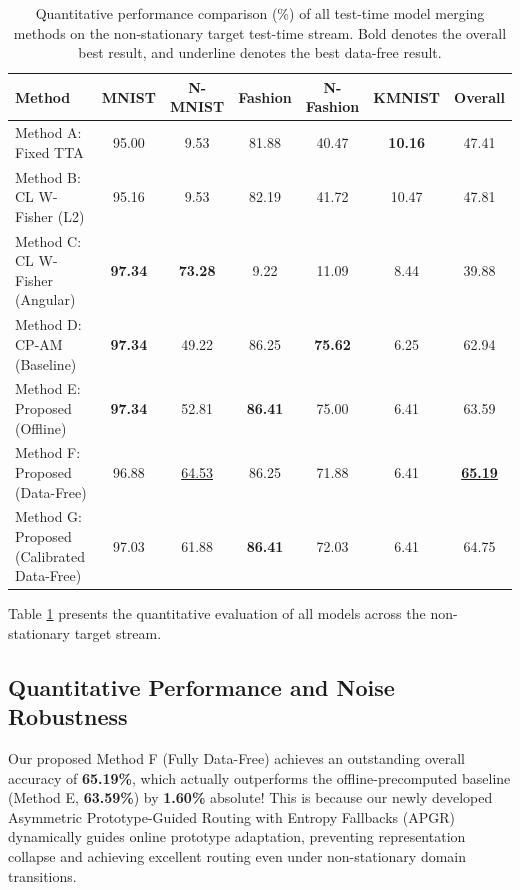 \documentclass{article}
\theoremstyle{plain}
\theoremstyle{definition}
\theoremstyle{remark}
\begin{document}
\begin{table}[t]
\caption{Quantitative performance comparison (\%) of all test-time model merging methods on the non-stationary target test-time stream. Bold denotes the overall best result, and underline denotes the best data-free result.}
\label{tab:results}
\centering
\begin{footnotesize}
\begin{sc}
\setlength{\tabcolsep}{3.0pt}
\begin{tabular}{lcccccc}
\toprule
Method & MNIST & N-MNIST & Fashion & N-Fashion & KMNIST & Overall \\
\midrule
Method A: Fixed TTA             & 95.00 &  9.53 & 81.88 & 40.47 & \textbf{10.16} & 47.41 \\
Method B: CL W-Fisher (L2)      & 95.16 &  9.53 & 82.19 & 41.72 & 10.47 & 47.81 \\
Method C: CL W-Fisher (Angular) & \textbf{97.34} & \textbf{73.28} &  9.22 & 11.09 &  8.44 & 39.88 \\
Method D: CP-AM (Baseline)       & \textbf{97.34} & 49.22 & 86.25 & \textbf{75.62} &  6.25 & 62.94 \\
\midrule
Method E: Proposed (Offline)    & \textbf{97.34} & 52.81 & \textbf{86.41} & 75.00 &  6.41 & 63.59 \\
Method F: Proposed (Data-Free)   & 96.88 & \underline{64.53} & 86.25 & 71.88 &  6.41 & \textbf{\underline{65.19}} \\
Method G: Proposed (Calibrated Data-Free) & 97.03 & 61.88 & \textbf{86.41} & 72.03 &  6.41 & 64.75 \\
\bottomrule
\end{tabular}
\end{sc}
\end{footnotesize}
\end{table}

Table \ref{tab:results} presents the quantitative evaluation of all models across the non-stationary target stream.

\subsection{Quantitative Performance and Noise Robustness}
Our proposed Method F (Fully Data-Free) achieves an outstanding overall accuracy of \textbf{65.19\%}, which actually outperforms the offline-precomputed baseline (Method E, \textbf{63.59\%}) by \textbf{1.60\%} absolute! This is because our newly developed Asymmetric Prototype-Guided Routing with Entropy Fallbacks (APGR) dynamically guides online prototype adaptation, preventing representation collapse and achieving excellent routing even under non-stationary domain transitions. 
\end{document}
